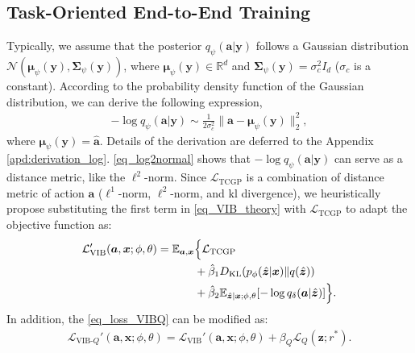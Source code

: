 \subsection{Task-Oriented End-to-End Training}
\label{subsec_task-oriented_training}
Typically, we assume that the posterior $q_{\psi}(\bm{a}|\bm{y})$ follows a Gaussian distribution $\mathcal{N}(\bm{\mu}_{\psi}(\bm{y}), \bm{\Sigma}_{\psi}(\bm{y}))$, where $\bm{\mu}_{\psi}(\bm{y})\in\mathbb{R}^{d}$ and $\bm{\Sigma}_{\psi}(\bm{y})=\sigma_{c}^{2}I_{d}$ ($\sigma_{c}$ is a constant). According to the probability density function of the Gaussian distribution, we can derive the following expression,
\begin{align}
    -\log{q_{\psi}(\bm{a}|\bm{y})}\sim \frac{1}{2\sigma^{2}_{c}}\|\bm{a}-\bm{\mu}_{\psi}(\bm{y}) \|^2_2,
    \label{eq_log2normal}
\end{align}
where $\bm{\mu}_{\psi}(\bm{y})=\hat{\bm{a}}$.
Details of the derivation are deferred to the Appendix \ref{apd:derivation_log}. \cref{eq_log2normal} shows that $-\log q_{\psi}(\bm{a}|\bm{y})$ can serve as a distance metric, like the $\ell^2$-norm. 
Since $\mathcal{L}_{\text{TCGP}}$ is a combination of distance metric of action $\bm{a}$ ($\ell^1$-norm, $\ell^2$-norm, and \gls{kl} divergence), we heuristically propose substituting the first term in \cref{eq_VIB_theory} with $\mathcal{L}_{\text{TCGP}}$ to adapt the objective function as:
\begin{align}
\mathcal{L}_{\text{VIB}}'(\bm{a}, \bm{x};\phi, \theta)=\mathbb{E}_{\bm{a},\bm{x}}&\Bigl\{
\mathcal{L}_{\text{TCGP}} \notag\\
&+\hat{\beta}_1 D_{\text{KL}}(p_{\phi}(\hat{\bm{z}} | \bm{x}) \| q(\hat{\bm{z}})) \notag\\
&+\hat{\beta}_2 \mathbb{E}_{\hat{\bm{z}}|\bm{x};\phi,\theta}[-\log q_{\delta}(\bm{a}|\hat{\bm{z}})]
\Bigr\}.
\label{eq_VIB_2}
\end{align}
In addition, the \cref{eq_loss_VIBQ} can be modified as:
\begin{align}
    \mathcal{L}_{\text{VIB-}Q}'(\bm{a}, \bm{x};\phi,\theta)=\mathcal{L}_{\text{VIB}}'(\bm{a}, \bm{x};\phi,\theta) + \beta_{Q}\mathcal{L}_{Q}(\bm{z};r^*).
    \label{eq_loss_VIBQ_2}
\end{align}

